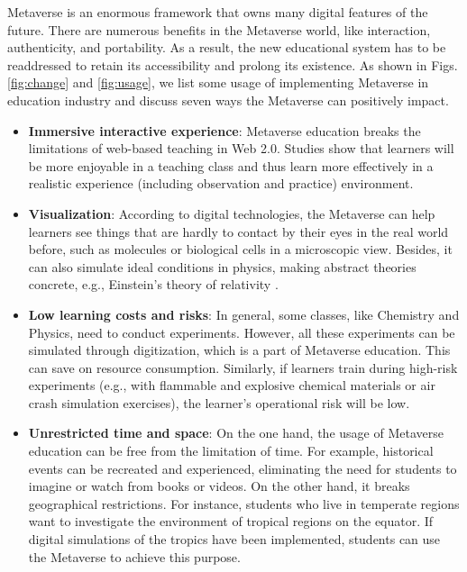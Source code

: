 \documentclass[conference]{IEEEtran}
\begin{document}
Metaverse is an enormous framework that owns many digital features of the future. There are numerous benefits in the Metaverse world, like interaction, authenticity, and portability. As a result, the new educational system has to be readdressed to retain its accessibility and prolong its existence. As shown in Figs. \ref{fig:change} and \ref{fig:usage}, we list some usage of implementing Metaverse in education industry and discuss seven ways the Metaverse can positively impact.

\begin{itemize}
    \item \textbf{Immersive interactive experience}: Metaverse education breaks the limitations of web-based teaching in Web 2.0. Studies \cite{parong2021cognitive,lehikko2021measuring} show that learners will be more enjoyable in a teaching class and thus learn more effectively in a realistic experience (including observation and practice) environment.
    
    \item \textbf{Visualization}: According to digital technologies, the Metaverse can help learners see things that are hardly to contact by their eyes in the real world before, such as molecules or biological cells \cite{thompson2021immersion} in a microscopic view. Besides, it can also simulate ideal conditions in physics, making abstract theories concrete, e.g., Einstein's theory of relativity \cite{georgiou2021learning}.
    
    \item \textbf{Low learning costs and risks}: In general, some classes, like Chemistry and Physics, need to conduct experiments. However, all these experiments can be simulated through digitization, which is a part of Metaverse education. This can save on resource consumption. Similarly, if learners train during high-risk experiments (e.g., with flammable and explosive chemical materials or air crash simulation exercises), the learner's operational risk will be low.
    
    \item \textbf{Unrestricted time and space}: On the one hand, the usage of Metaverse education can be free from the limitation of time. For example, historical events can be recreated and experienced, eliminating the need for students to imagine or watch from books or videos. On the other hand, it breaks geographical restrictions. For instance, students who live in temperate regions want to investigate the environment of tropical regions on the equator. If digital simulations of the tropics have been implemented, students can use the Metaverse to achieve this purpose.
  

\end{itemize}
\end{document}
